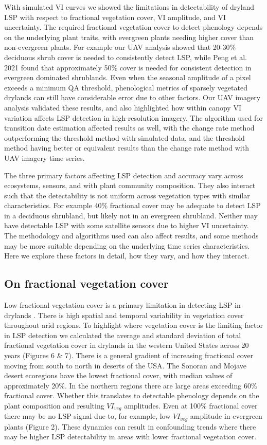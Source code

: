 \documentclass{article}
\begin{document}
With simulated VI curves we showed the limitations in detectability of dryland LSP with respect to fractional vegetation cover, VI amplitude, and VI uncertainty. The required fractional vegetation cover to detect phenology depends on the underlying plant traits, with evergreen plants needing higher cover than non-evergreen plants. For example our UAV analysis showed that 20-30\% deciduous shrub cover is needed to consistently detect LSP, while Peng et al. 2021 \cite{peng2021} found that approximately 50\% cover is needed for consistent detection in evergreen dominated shrublands. Even when the seasonal amplitude of a pixel exceeds a minimum QA threshold, phenological metrics of sparsely vegetated drylands can still have considerable error due to other factors.  Our UAV imagery analysis validated these results, and also highlighted how within canopy VI variation affects LSP detection in high-resolution imagery. The algorithm used for transition date estimation affected results as well, with the change rate method outperforming the threshold method with simulated data, and the threshold method having better or equivalent results than the change rate method with UAV imagery time series. 

The three primary factors affecting LSP detection and accuracy vary across ecosystems, sensors, and with plant community composition. They also interact such that the detectability is not uniform across vegetation types with similar characteristics. For example 40\% fractional cover may be adequate to detect LSP in a deciduous shrubland, but likely not in an evergreen shrubland. Neither may have detectable LSP with some satellite sensors due to higher VI uncertainty. The methodology and algorithms used can also affect results, and some methods may be more suitable depending on the underlying time series characteristics. Here we explore these factors in detail, how they vary, and how they interact. 

\subsection{On fractional vegetation cover}
Low fractional vegetation cover is a primary limitation in detecting LSP in drylands \cite{smith2019}. There is high spatial and temporal variability in vegetation cover throughout arid regions. To highlight where vegetation cover is the limiting factor in LSP detection we calculated the average and standard deviation of total fractional vegetation cover in drylands in the western United States across 20 years (Figures 6 \& 7). There is a general gradient of increasing fractional cover moving from south to north in deserts of the USA. The Sonoran and Mojave desert ecoregions have the lowest fractional cover, with median values of approximately 20\%. In the northern regions there are large areas exceeding 60\% fractional cover. Whether this translates to detectable phenology depends on the plant composition and resulting $VI_{veg}$ amplitudes. Even at 100\% fractional cover there may be no LSP signal due to, for example, low $VI_{veg}$ amplitude in evergreen plants (Figure 2). These dynamics can result in confounding trends where there may be higher LSP detectability in areas with lower fractional vegetation cover.
\end{document}
